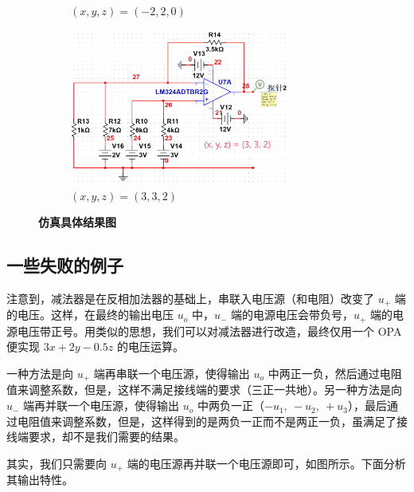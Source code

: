 \documentclass[UTF8]{report}
\theoremstyle{MyLineTheoremStyle} %
\theoremstyle{MyBlockTheoremStyle} %
\theoremstyle{MySubsubsectionStyle} %
\begin{document}
\begin{figure}[H]
\begin{subfigure}[t]{0.48\textwidth}
    \caption{\bfseries $(x,y,z) = (-2,2,0)$ }
\end{subfigure}\begin{subfigure}[t]{0.48\textwidth}\centering
    \includegraphics[height=145pt]{assets/3/def5c414621689edf67e4afb5251cf4a.png}
    \caption{\bfseries $(x,y,z) = (3,3,2)$ }
\end{subfigure}
\caption{\bfseries 仿真具体结果图 }\label{一个图}
\end{figure}


\subsection{一些失败的例子}
注意到，减法器是在反相加法器的基础上，串联入电压源（和电阻）改变了 $u_+$ 端的电压。这样，在最终的输出电压 $u_o$ 中，$u_-$ 端的电源电压会带负号，$u_+$ 端的电源电压带正号。用类似的思想，我们可以对减法器进行改造，最终仅用一个 OPA 便实现 $3x+2y-0.5z$ 的电压运算。

一种方法是向 $u_+$ 端再串联一个电压源，使得输出 $u_o$ 中两正一负，然后通过电阻值来调整系数，但是，这样不满足接线端的要求（三正一共地）。另一种方法是向 $u_-$ 端再并联一个电压源，使得输出 $u_o$ 中两负一正（$-u_1,\ -u_2,\ +u_3$），最后通过电阻值来调整系数，但是，这样得到的是两负一正而不是两正一负，虽满足了接线端要求，却不是我们需要的结果。

其实，我们只需要向 $u_+$ 端的电压源再并联一个电压源即可，如图所示。下面分析其输出特性。
\end{document}
